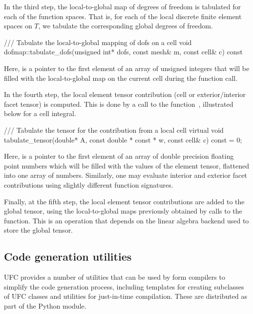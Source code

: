 In the third step, the local-to-global map of degrees of freedom is
tabulated for each of the function spaces. That is, for each of the
local discrete finite element spaces on $T$, we tabulate the
corresponding global degrees of freedom.

\begin{c++}
/// Tabulate the local-to-global mapping of dofs on a cell
void dofmap::tabulate_dofs(unsigned int* dofs,
                           const mesh& m,
                           const cell& c) const
\end{c++}
Here,  is a pointer to the first element of an
array of unsigned integers that will be filled with the
local-to-global map on the current cell during the function call.

In the fourth step, the local element tensor contribution (cell or
exterior/interior facet tensor) is computed. This is done by a call to
the function~, illustrated below for a cell
integral.
\begin{c++}
/// Tabulate the tensor for the contribution from a local cell
virtual void tabulate_tensor(double* A,
                             const double * const * w,
                             const cell& c) const = 0;
\end{c++}
Here,  is a pointer to the first element of an array of
double precision floating point numbers which will be filled with the
values of the element tensor, flattened into one array of
numbers. Similarly, one may evaluate interior and exterior facet
contributions using slightly different function signatures.

Finally, at the fifth step, the local element tensor contributions are
added to the global tensor, using the local-to-global maps previously
obtained by calls to the  function. This is an
operation that depends on the linear algebra backend used to store the
global tensor.

\subsection{Code generation utilities}

UFC provides a number of utilities that can be used by form compilers
to simplify the code generation process, including templates for
creating subclasses of UFC classes and utilities for just-in-time
compilation.  These are distributed as part of the 
Python module.

